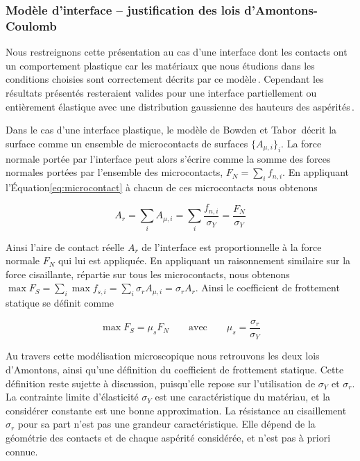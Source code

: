 \subsubsection[Modèle d'interface -- lois d'Amontons-Coulomb]{Modèle d'interface -- justification des lois d'Amontons-Coulomb}
\label{sec:amontonsmicro}

Nous restreignons cette présentation au cas d'une interface dont les contacts ont un comportement plastique car les matériaux que nous étudions dans les conditions choisies sont correctement décrits par ce modèle\,\cite{rubinstein_crack-like_2006}. Cependant les résultats présentés resteraient valides pour une interface partiellement ou entièrement élastique avec une distribution gaussienne des hauteurs des aspérités\,\cite{singer_contact_1992}.


Dans le cas d'une interface plastique, le modèle de Bowden et Tabor\,\cite{bowden_friction_1950} décrit la surface comme un ensemble de microcontacts de surfaces $\{A_{\mu,i}\}_i$. La force normale portée par l'interface peut alors s'écrire comme la somme des forces normales portées par l'ensemble des microcontacts, $F_N = \sum_if_{n,i}$. En appliquant l'Équation\:\ref{eq:microcontact} à chacun de ces microcontacts nous obtenons

\begin{equation}
A_r = \sum_i A_{\mu,i} = \sum_i\frac{f_{n,i}}{\sigma_Y} = \frac{F_N}{\sigma_Y}
\label{eq:wamu}
\end{equation}

Ainsi l'aire de contact réelle $A_r$ de l'interface est proportionnelle à la force normale $F_N$ qui lui est appliquée. En appliquant un raisonnement similaire sur la force cisaillante, répartie sur tous les microcontacts, nous obtenons $\max F_S = \sum_i \max f_{s,i} = \sum_i  \sigma_rA_{\mu,i} = \sigma_r A_r$. Ainsi le coefficient de frottement statique se définit comme

\begin{equation}
\max F_S = \mu_sF_N\qquad\text{avec} \qquad \mu_s = \dfrac{\sigma_r}{\sigma_Y}
\label{eq:maxfs1}
\end{equation}



Au travers cette modélisation microscopique nous retrouvons les deux lois d'Amontons, ainsi qu'une définition du coefficient de frottement statique. Cette définition reste sujette à discussion, puisqu'elle repose sur l'utilisation de $\sigma_Y$ et $\sigma_r$. La contrainte limite d'élasticité $\sigma_Y$ est une caractéristique du matériau, et la considérer constante est une bonne approximation. La résistance au cisaillement $\sigma_r$ pour sa part n'est pas une grandeur caractéristique. Elle dépend de la géométrie des contacts et de chaque aspérité considérée, et n'est pas à priori connue.


